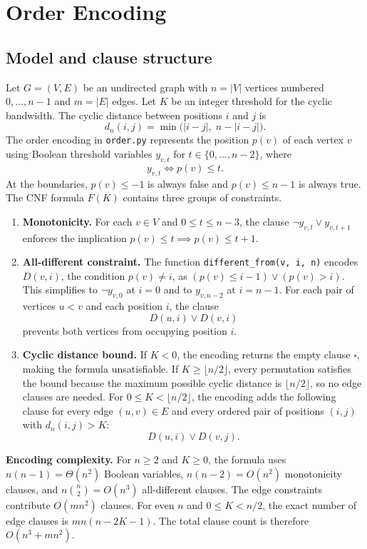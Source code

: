 \section{Order Encoding}

\subsection{Model and clause structure}
Let $G=(V,E)$ be an undirected graph with $n=|V|$ vertices numbered
$0,\ldots,n-1$ and $m=|E|$ edges. Let $K$ be an integer threshold for the
cyclic bandwidth. The cyclic distance between positions $i$ and $j$ is
\[
d_n(i,j)=\min\bigl(|i-j|,\;n-|i-j|\bigr).
\]
The order encoding in \texttt{order.py} represents the position $p(v)$ of
each vertex $v$ using Boolean threshold variables $y_{v,t}$ for
$t\in\{0,\ldots,n-2\}$, where
\[
y_{v,t}\iff p(v)\le t.
\]
At the boundaries, $p(v)\le -1$ is always false and $p(v)\le n-1$ is
always true. The CNF formula $F(K)$ contains three groups of constraints.
\begin{enumerate}
\item \textbf{Monotonicity.} For each $v\in V$ and $0\le t\le n-3$,
the clause $\neg y_{v,t}\lor y_{v,t+1}$ enforces the implication
$p(v)\le t\implies p(v)\le t+1$.
\item \textbf{All-different constraint.} The function
\texttt{different\_from(v, i, n)} encodes $D(v,i)$, the condition $p(v)\ne i$, as
$(p(v)\le i-1)\lor(p(v)>i)$. This simplifies to $\neg y_{v,0}$ at $i=0$
and to $y_{v,n-2}$ at $i=n-1$. For each pair of vertices $u<v$ and
each position $i$, the clause
\[
D(u,i)\lor
D(v,i)
\]
prevents both vertices from occupying position $i$.
\item \textbf{Cyclic distance bound.} If $K<0$, the encoding returns the
empty clause $\square$, making the formula unsatisfiable. If
$K\ge\lfloor n/2\rfloor$, every permutation satisfies the bound because
the maximum possible cyclic distance is $\lfloor n/2\rfloor$, so no edge
clauses are needed. For $0\le K<\lfloor n/2\rfloor$, the encoding adds
the following clause for every edge $(u,v)\in E$ and every ordered pair
of positions $(i,j)$ with $d_n(i,j)>K$:
\[
D(u,i)\lor
D(v,j).
\]
\end{enumerate}

\textbf{Encoding complexity.} For $n\ge 2$ and $K\ge 0$, the formula uses
$n(n-1)=\Theta(n^2)$ Boolean variables, $n(n-2)=O(n^2)$ monotonicity
clauses, and $n\binom{n}{2}=O(n^3)$ all-different clauses. The edge
constraints contribute $O(mn^2)$ clauses. For even $n$ and $0\le K<n/2$,
the exact number of edge clauses is $mn(n-2K-1)$. The total clause count
is therefore $O(n^3+mn^2)$.

